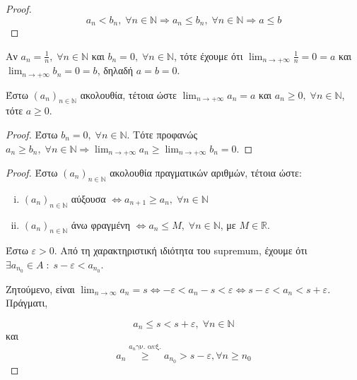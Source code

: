 \documentclass[main.tex]{subfiles}
\begin{document}

\begin{proof}
\item {}
  \[ a_{n}< b_{n}, \; \forall n \in \mathbb{N} \Rightarrow a_{n} \leq 
  b_{n}, \; \forall n \in \mathbb{N} \Rightarrow a \leq b \]
\end{proof}

\begin{rem}
\item {}
  Αν $ a_{n}= \frac{1}{n}, \; \forall n \in \mathbb{N} $ 
  και $ b_{n}=0, \; \forall n \in \mathbb{N} $, τότε έχουμε ότι 
  $ \lim_{n \to +\infty} \frac{1}{n} = 0 = a $ και $ \lim_{n \to
  +\infty} b_{n} = 0 = b $, δηλαδή $ a=b=0  $.
\end{rem}

\begin{cor}
  Έστω $ (a_{n})_{n \in \mathbb{N}} $ ακολουθία, τέτοια ώστε 
  $ \lim_{n \to +\infty} a_{n} = a$ και $ a_{n} \geq 0, \; \forall 
  n \in \mathbb{N} $, τότε $ a \geq 0 $.
\end{cor}

\begin{proof}
  Έστω $ b_{n} = 0, \; \forall n \in \mathbb{N} $. Τότε προφανώς 
  $ a_{n} \geq b_{n}, \; \forall n
  \in \mathbb{N} \Rightarrow \lim_{n \to +\infty} a_{n} \geq 
  \lim_{n \to +\infty} b_{n} = 0$.
\end{proof}


\begin{proof}
  Έστω $ (a_{n})_{n \in \mathbb{N}} $ ακολουθία πραγματικών αριθμών, 
  τέτοια ώστε:
  \begin{enumerate}[i)]
    \item $ (a_{n})_{n \in \mathbb{N}} $ αύξουσα $ \Leftrightarrow 
      a_{n+1} \geq a_{n}, \; \forall n \in \mathbb{N}$ 
    \item $ (a_{n})_{n \in \mathbb{N}} $ άνω  φραγμένη $ 
      \Leftrightarrow a_{n} \leq M, \; \forall n \in 
      \mathbb{N}$, με $ M \in \mathbb{R} $.
  \end{enumerate}

  Έστω $ \varepsilon >0 $. Από τη χαρακτηριστική ιδιότητα του 
  supremum, έχουμε ότι $ \exists a_{n_{0}} \in A \; : \; s - \varepsilon 
  < a_{n_{0}} $.

  Ζητούμενο, είναι $ \lim_{n \to \infty} a_{n} = s \Leftrightarrow 
  - \varepsilon < a_{n} -s < \varepsilon \Leftrightarrow s - 
  \varepsilon < a_{n} < s + \varepsilon $. Πράγματι, 

  \[ a_{n} \leq s < s + \varepsilon, \; \forall n \in \mathbb{N} \] και 
  \[ a_{n} \overset{a_{n} \text{γν. αυξ.}}{\geq} a_{n_{0}} > s - 
  \varepsilon, \forall n \geq n_{0} \]
\end{proof}
\end{document}
